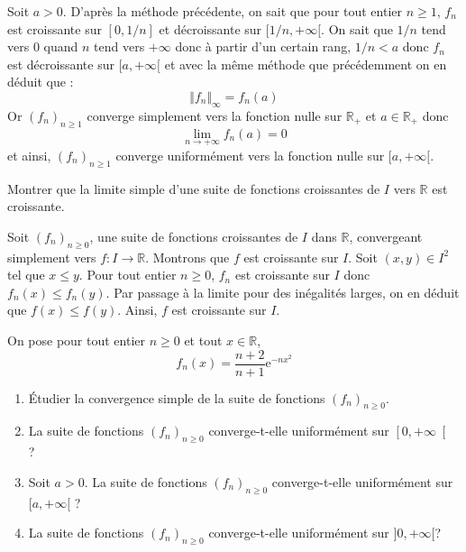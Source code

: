 \documentclass[a4paper,10pt]{report}
\begin{document}
\begin{enumerate}
\noindent Soit $a>0$. D'après la méthode précédente, on sait que pour tout entier $n \geq 1$, $f_n$ est croissante sur $[0,1/n]$ et décroissante sur $[1/n, + \infty[$. On sait que $1/n$ tend vers $0$ quand $n$ tend vers $+ \infty$ donc à partir d'un certain rang, $1/n<a$ donc $f_n$ est décroissante sur $[a, + \infty[$ et avec la même méthode que précédemment on en déduit que :
$$  \Vert f_n \Vert_{\infty} = f_n(a)$$
Or $(f_n)_{n \geq 1}$ converge simplement vers la fonction nulle sur $\mathbb{R}_+$ et $a \in \mathbb{R}_+$ donc 
$$ \lim_{n \rightarrow + \infty} f_n(a) = 0$$
et ainsi, $(f_n)_{n \geq 1}$ converge uniformément vers la fonction nulle sur $[a, + \infty[$.

\end{enumerate}

\medskip


\begin{Exercice}{} Montrer que la limite simple d'une suite de fonctions croissantes de $I$ vers $\mathbb{R}$ est croissante.
\end{Exercice}

\corr Soit $(f_n)_{n \geq 0}$, une suite de fonctions croissantes de $I$ dans $\mathbb{R}$, convergeant simplement vers $f : I \rightarrow \mathbb{R}$. Montrons que $f$ est croissante sur $I$. Soit $(x,y) \in I^2$ tel que $x \leq y$. Pour tout entier $n \geq 0$, $f_n$ est croissante sur $I$ donc $f_n(x) \leq f_n(y)$. Par passage à la limite pour des inégalités larges, on en déduit que $f(x) \leq f(y)$. Ainsi, $f$ est croissante sur $I$.

\medskip

\begin{Exercice}{} On pose pour tout entier $n \geq 0$ et tout $x \in \mathbb{R}$,
$$f_{n}(x) =\dfrac{n+2}{n+1}\mathrm{e}^{-n x^{2}}$$
\begin{enumerate}
\item \'Etudier la convergence simple de la suite de fonctions $\left(f_{n}\right) _{n \geq 0}$.
\item La suite de fonctions  $\left(f_{n}\right) _{n \geq 0}$ converge-t-elle uniformément sur $\left[ 0,+\infty\right[$ ?
\item Soit $a>0$. La suite de fonctions $\left(f_{n}\right) _{n \geq 0}$ converge-t-elle uniform\'{e}ment sur  $[a,+\infty[$ ?	
\item La suite de fonctions  $\left(f_{n}\right) _{n \geq 0}$ converge-t-elle uniform\'{e}ment sur $]0,+\infty[$? 
\end{enumerate}
\end{Exercice}
\end{document}
